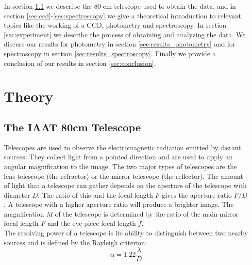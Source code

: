 \documentclass[12pt,a4paper]{article}
\begin{document}
  In section \ref{sec:80tele} we describe the 80 cm telescope used to obtain the data, and in section \ref{sec:ccd}-\ref{sec:spectroscopy} we give a theoretical introduction to relevant topics like the working of a CCD, photometry and spectroscopy.
  In section \ref{sec:experiment} we describe the process of obtaining and analyzing the data. We discuss our results for photometry in section \ref{sec:results_photometry} and for spectroscopy in section \ref{sec:results_spectroscopy}. Finally we
  provide a conclusion of our results in section \ref{sec:conclusion}.
\section{Theory}\label{sec:theory}
\subsection{The IAAT 80cm Telescope}
\label{sec:80tele}
  Telescopes are used to observe the electromagnetic radiation emitted by distant sources. They collect light from a pointed direction and are used to apply an angular magnification to the image. The two major types of telescopes are 
  the lens telescope (the refractor) or the mirror telescope (the reflector). The amount of light that a telescope can gather depends on the aperture of the telescope with diameter $D$. The ratio of this and the focal length
  $F$ gives the aperture ratio $F/D$. A telescope with a higher aperture ratio will produce a brighter image. The magnification $M$ of the telescope is determined by the ratio of the main mirror focal length $F$ and the eye piece focal length
  $f$.
  \\
  The resolving power of a telescope is its ability to distinguish between two nearby sources and is defined by the Rayleigh criterion:
  \begin{equation*}
    \alpha = 1.22 \frac{\lambda}{D}
  \end{equation*}
\end{document}
